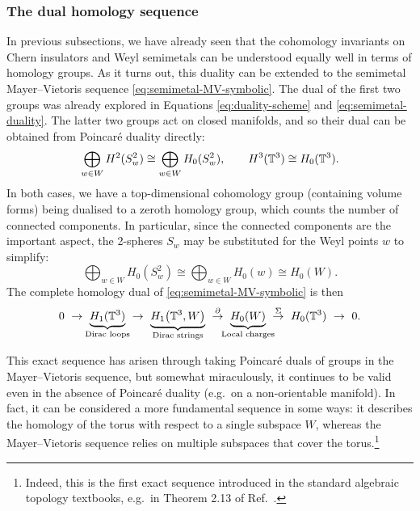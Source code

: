 \subsubsection{The dual homology sequence}

In previous subsections, we have already seen that the cohomology invariants on Chern insulators and Weyl semimetals can be understood equally well in terms of homology groups. As it turns out, this duality can be extended to the semimetal Mayer--Vietoris sequence \eqref{eq:semimetal-MV-symbolic}. The dual of the first two groups was already explored in Equations \eqref{eq:duality-scheme} and \eqref{eq:semimetal-duality}. The latter two groups act on closed manifolds, and so their dual can be obtained from Poincar\'e duality directly:
\begin{equation*}
	\bigoplus_{w\in W} H^2(S_w^2) \cong \bigoplus_{w\in W} H_0(S_w^2), \qquad
	H^3(\mathbb{T}^3) \cong H_0(\mathbb{T}^3).
\end{equation*}
In both cases, we have a top-dimensional cohomology group (containing volume forms) being dualised to a zeroth homology group, which counts the number of connected components. In particular, since the connected components are the important aspect, the 2-spheres $S_w$ may be substituted for the Weyl points $w$ to simplify:
\begin{equation*}
	\bigoplus_{w\in W} H_0(S_w^2) \cong \bigoplus_{w\in W} H_0(w) \cong H_0(W).
\end{equation*}
The complete homology dual of \eqref{eq:semimetal-MV-symbolic} is then
\begin{equation}\label{eq:semimetal-homology-sequence}
	0\ \to\ \underbrace{H_1(\T^3)}_{\mathclap{\text{Dirac loops}}}\ \to\ 
	\underbrace{H_1\big(\T^3, W\big)}_{\text{Dirac strings}}\ \overset{\partial}{\to}\ \underbrace{H_0(W)}_{\mathclap{\text{Local charges}}}\ \overset{\Sigma}{\to}\ H_0(\T^3)\ \to\ 0.
\end{equation}

This exact sequence has arisen through taking Poincaré duals of groups in the Mayer--Vietoris sequence, but somewhat miraculously, it continues to be valid even in the absence of Poincaré duality (e.g.\ on a non-orientable manifold). In fact, it can be considered a more fundamental sequence in some ways: it describes the homology of the torus with respect to a single subspace $W$, whereas the Mayer--Vietoris sequence relies on multiple subspaces that cover the torus.\footnote{
	Indeed, this is the first exact sequence introduced in the standard algebraic topology textbooks, e.g.\ in Theorem 2.13 of Ref.~\cite{Hatcher_algebraic-topology}.}
	
